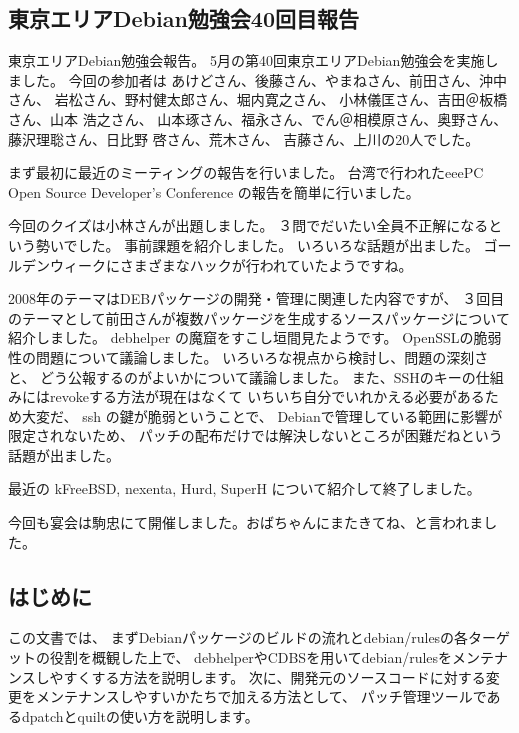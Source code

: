 \documentclass[mingoth,a4paper]{jsarticle}
\begin{document}
\subsection{東京エリアDebian勉強会40回目報告}



東京エリアDebian勉強会報告。 5月の第40回東京エリアDebian勉強会を実施しました。  
今回の参加者は あけどさん、後藤さん、やまねさん、前田さん、沖中さん、 岩松さん、野村健太郎さん、堀内寛之さん、 小林儀匡さん、吉田＠板橋さん、山本 浩之さん、 山本琢さん、福永さん、でん＠相模原さん、奥野さん、 藤沢理聡さん、日比野 啓さん、荒木さん、 吉藤さん、上川の20人でした。

まず最初に最近のミーティングの報告を行いました。 台湾で行われたeeePC Open Source Developer's Conference の報告を簡単に行いました。

今回のクイズは小林さんが出題しました。 ３問でだいたい全員不正解になるという勢いでした。
事前課題を紹介しました。 いろいろな話題が出ました。 ゴールデンウィークにさまざまなハックが行われていたようですね。

2008年のテーマはDEBパッケージの開発・管理に関連した内容ですが、 ３回目のテーマとして前田さんが複数パッケージを生成するソースパッケージについて紹介しました。 debhelper の魔窟をすこし垣間見たようです。
OpenSSLの脆弱性の問題について議論しました。 いろいろな視点から検討し、問題の深刻さと、 どう公報するのがよいかについて議論しました。 また、SSHのキーの仕組みにはrevokeする方法が現在はなくて いちいち自分でいれかえる必要があるため大変だ、 ssh の鍵が脆弱ということで、 Debianで管理している範囲に影響が限定されないため、 パッチの配布だけでは解決しないところが困難だねという話題が出ました。

最近の kFreeBSD, nexenta, Hurd, SuperH について紹介して終了しました。

今回も宴会は駒忠にて開催しました。おばちゃんにまたきてね、と言われました。


\label{sec:dpatchdebhelper}

\subsection{はじめに}

この文書では、
まずDebianパッケージのビルドの流れとdebian/rulesの各ターゲットの役割を概観した上で、
debhelperやCDBSを用いてdebian/rulesをメンテナンスしやすくする方法を説明します。
次に、開発元のソースコードに対する変更をメンテナンスしやすいかたちで加える方法として、
パッチ管理ツールであるdpatchとquiltの使い方を説明します。
\end{document}
